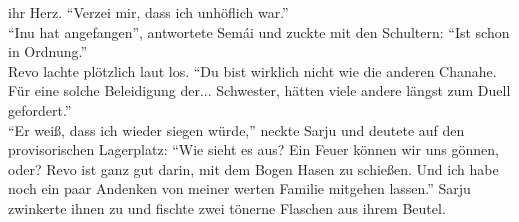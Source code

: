ihr Herz. ``Verzei mir, dass ich unhöflich war.''\\
``Inu hat angefangen'', antwortete Semái und zuckte mit den Schultern: ``Ist schon in Ordnung.''\\
Revo lachte plötzlich laut los. ``Du bist wirklich nicht wie die anderen Chanahe. Für eine solche 
Beleidigung der... Schwester, hätten viele andere längst zum Duell gefordert.''\\
``Er weiß, dass ich wieder siegen würde,'' neckte Sarju und deutete auf den provisorischen 
Lagerplatz: ``Wie sieht es aus? Ein Feuer können wir uns gönnen, oder? Revo ist ganz gut darin, mit 
dem Bogen Hasen zu schießen. Und ich habe noch ein paar Andenken von meiner werten Familie mitgehen 
lassen.'' Sarju zwinkerte ihnen zu und fischte zwei tönerne Flaschen aus ihrem Beutel.\\

